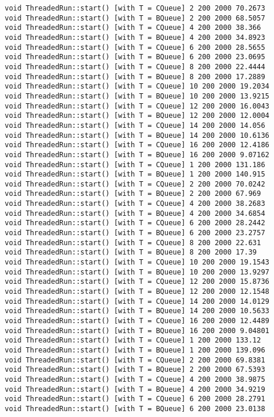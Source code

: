 \begin{verbatim}
void ThreadedRun::start() [with T = CQueue] 2 200 2000 70.2673
void ThreadedRun::start() [with T = BQueue] 2 200 2000 68.5057
void ThreadedRun::start() [with T = CQueue] 4 200 2000 38.366
void ThreadedRun::start() [with T = BQueue] 4 200 2000 34.8923
void ThreadedRun::start() [with T = CQueue] 6 200 2000 28.5655
void ThreadedRun::start() [with T = BQueue] 6 200 2000 23.0695
void ThreadedRun::start() [with T = CQueue] 8 200 2000 22.4444
void ThreadedRun::start() [with T = BQueue] 8 200 2000 17.2889
void ThreadedRun::start() [with T = CQueue] 10 200 2000 19.2034
void ThreadedRun::start() [with T = BQueue] 10 200 2000 13.9215
void ThreadedRun::start() [with T = CQueue] 12 200 2000 16.0043
void ThreadedRun::start() [with T = BQueue] 12 200 2000 12.0004
void ThreadedRun::start() [with T = CQueue] 14 200 2000 14.056
void ThreadedRun::start() [with T = BQueue] 14 200 2000 10.6136
void ThreadedRun::start() [with T = CQueue] 16 200 2000 12.4186
void ThreadedRun::start() [with T = BQueue] 16 200 2000 9.07162
void ThreadedRun::start() [with T = CQueue] 1 200 2000 131.186
void ThreadedRun::start() [with T = BQueue] 1 200 2000 140.915
void ThreadedRun::start() [with T = CQueue] 2 200 2000 70.0242
void ThreadedRun::start() [with T = BQueue] 2 200 2000 67.969
void ThreadedRun::start() [with T = CQueue] 4 200 2000 38.2683
void ThreadedRun::start() [with T = BQueue] 4 200 2000 34.6854
void ThreadedRun::start() [with T = CQueue] 6 200 2000 28.2442
void ThreadedRun::start() [with T = BQueue] 6 200 2000 23.2757
void ThreadedRun::start() [with T = CQueue] 8 200 2000 22.631
void ThreadedRun::start() [with T = BQueue] 8 200 2000 17.39
void ThreadedRun::start() [with T = CQueue] 10 200 2000 19.1543
void ThreadedRun::start() [with T = BQueue] 10 200 2000 13.9297
void ThreadedRun::start() [with T = CQueue] 12 200 2000 15.8736
void ThreadedRun::start() [with T = BQueue] 12 200 2000 12.1548
void ThreadedRun::start() [with T = CQueue] 14 200 2000 14.0129
void ThreadedRun::start() [with T = BQueue] 14 200 2000 10.5633
void ThreadedRun::start() [with T = CQueue] 16 200 2000 12.4489
void ThreadedRun::start() [with T = BQueue] 16 200 2000 9.04801
void ThreadedRun::start() [with T = CQueue] 1 200 2000 133.12
void ThreadedRun::start() [with T = BQueue] 1 200 2000 139.096
void ThreadedRun::start() [with T = CQueue] 2 200 2000 69.8381
void ThreadedRun::start() [with T = BQueue] 2 200 2000 67.5393
void ThreadedRun::start() [with T = CQueue] 4 200 2000 38.9875
void ThreadedRun::start() [with T = BQueue] 4 200 2000 34.9219
void ThreadedRun::start() [with T = CQueue] 6 200 2000 28.2791
void ThreadedRun::start() [with T = BQueue] 6 200 2000 23.0138

\end{verbatim}
